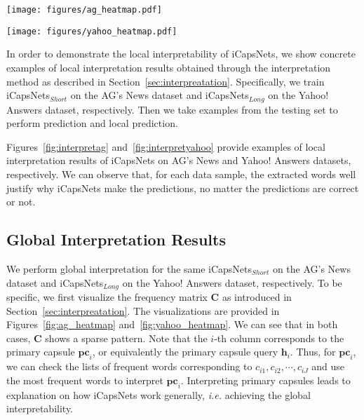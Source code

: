 \documentclass[10pt,journal,compsoc]{IEEEtran}
\begin{document}
\begin{figure*}[t]
	\centering
	\texttt{[image: figures/ag\_heatmap.pdf]}
	\caption{Visualization of the frequency matrix $\mathbf{C}$ for the global interpretation of iCapsNets$_{Short}$ on the AG's News dataset. For selected columns, we make a histogram and list the most frequent words as the interpretation of corresponding primary capsules. Note that primary capsules and primary capsule queries have a one-to-one relationship.}
	\label{fig:ag_heatmap}
\end{figure*}

\begin{figure*}[t]
	\centering
	\texttt{[image: figures/yahoo\_heatmap.pdf]}
	\caption{Visualization of the frequency matrix $\mathbf{C}$ for the global interpretation of iCapsNets$_{Long}$ on the Yahoo! Answers dataset. For selected columns, we make a histogram and list the most frequent words as the interpretation of corresponding primary capsules. Note that primary capsules and primary capsule queries have a one-to-one relationship.}
	\label{fig:yahoo_heatmap}
\end{figure*}

In order to demonstrate the local interpretability of iCapsNets, we show concrete examples of local interpretation results obtained through the interpretation method as described in Section~\ref{sec:interpreatation}. Specifically, we train iCapsNets$_{Short}$ on the AG's News dataset and iCapsNets$_{Long}$ on the Yahoo! Answers dataset, respectively. Then we take examples from the testing set to perform prediction and local prediction.

Figures~\ref{fig:interpretag} and~\ref{fig:interpretyahoo} provide examples of local interpretation results of iCapsNets on AG's News and Yahoo! Answers datasets, respectively. We can observe that, for each data sample, the extracted words well justify why iCapsNets make the predictions, no matter the predictions are correct or not.

\subsection{Global Interpretation Results}\label{sec:global_interpret_results}

We perform global interpretation for the same iCapsNets$_{Short}$ on the AG's News dataset and iCapsNets$_{Long}$ on the Yahoo! Answers dataset, respectively. To be specific, we first visualize the frequency matrix $\mathbf{C}$ as introduced in Section~\ref{sec:interpreatation}. The visualizations are provided in Figures~\ref{fig:ag_heatmap} and~\ref{fig:yahoo_heatmap}. We can see that in both cases, $\mathbf{C}$ shows a sparse pattern. Note that the $i$-th column corresponds to the primary capsule $\mathbf{pc}_i$, or equivalently the primary capsule query $\mathbf{h}_i$. Thus, for $\mathbf{pc}_i$, we can check the lists of frequent words corresponding to $c_{i1}, c_{i2}, \cdots, c_{iJ}$ and use the most frequent words to interpret $\mathbf{pc}_i$. Interpreting primary capsules leads to explanation on how iCapsNets work generally, \textit{i.e.} achieving the global interpretability.
\end{document}
